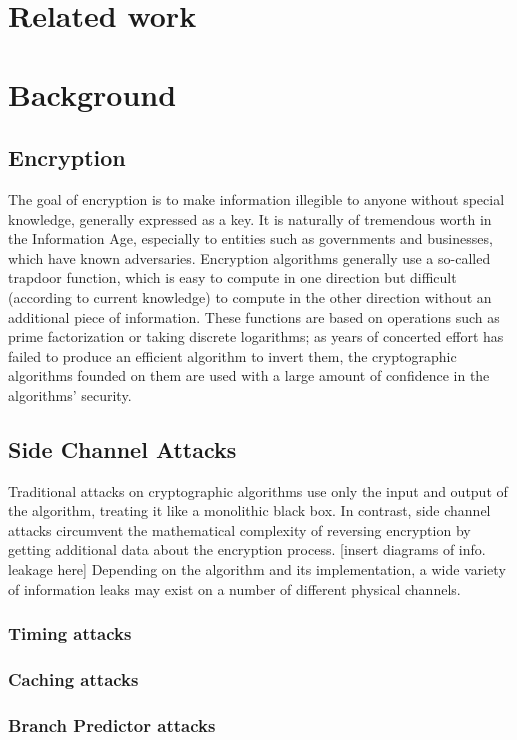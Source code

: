 \documentclass[times, 10pt,twocolumn]{article}
\begin{document}
\section{Related work}

\section{Background}
\subsection{Encryption}
The goal of encryption is to make information illegible to anyone without special knowledge, generally expressed as a key.  It is naturally of tremendous worth in the Information Age, especially to entities such as governments and businesses, which have known adversaries.  Encryption algorithms generally use a so-called trapdoor function, which is easy to compute in one direction but difficult (according to current knowledge) to compute in the other direction without an additional piece of information.  These functions are based on operations such as prime factorization or taking discrete logarithms; as years of concerted effort has failed to produce an efficient algorithm to invert them, the cryptographic algorithms founded on them are used with a large amount of confidence in the algorithms' security.
\subsection{Side Channel Attacks}
Traditional attacks on cryptographic algorithms use only the input and output of the algorithm, treating it like a monolithic black box.  In contrast, side channel attacks circumvent the mathematical complexity of reversing encryption by getting additional data about the encryption process.  [insert diagrams of info. leakage here]  Depending on the algorithm and its implementation, a wide variety of information leaks may exist on a number of different physical channels.
\subsubsection{Timing attacks}
\subsubsection{Caching attacks}
\subsubsection{Branch Predictor attacks}
\end{document}
